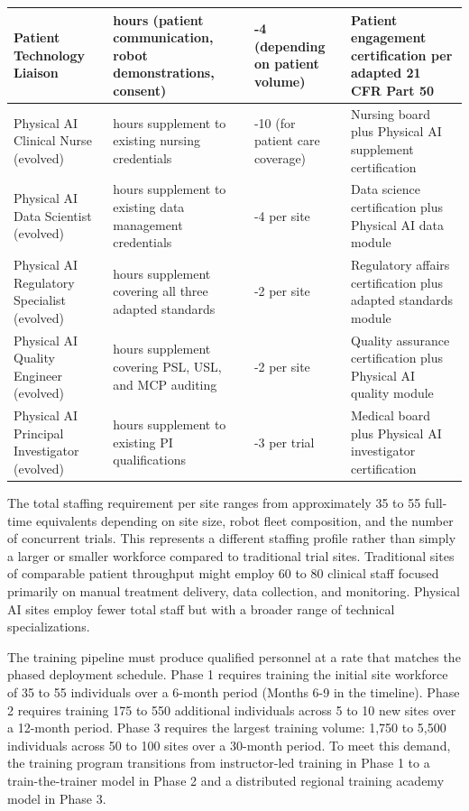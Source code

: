 \begin{longtable}{>{\raggedright\arraybackslash}p{3cm} >{\raggedright\arraybackslash}p{4cm} >{\raggedright\arraybackslash}p{4cm} >{\raggedright\arraybackslash}p{4cm}}
\midrule
Patient Technology Liaison & 80 hours (patient communication, robot demonstrations, consent) & 2-4 (depending on patient volume) & Patient engagement certification per adapted 21 CFR Part 50 \cite{cfr50-adapt} \\
\midrule
Physical AI Clinical Nurse (evolved) & 80 hours supplement to existing nursing credentials & 6-10 (for patient care coverage) & Nursing board plus Physical AI supplement certification \\
\midrule
Physical AI Data Scientist (evolved) & 160 hours supplement to existing data management credentials & 2-4 per site & Data science certification plus Physical AI data module \\
\midrule
Physical AI Regulatory Specialist (evolved) & 100 hours supplement covering all three adapted standards & 1-2 per site & Regulatory affairs certification plus adapted standards module \\
\midrule
Physical AI Quality Engineer (evolved) & 120 hours supplement covering PSL, USL, and MCP auditing & 1-2 per site & Quality assurance certification plus Physical AI quality module \\
\midrule
Physical AI Principal Investigator (evolved) & 80 hours supplement to existing PI qualifications & 1-3 per trial & Medical board plus Physical AI investigator certification \\
\end{longtable}

The total staffing requirement per site ranges from approximately 35 to 55
full-time equivalents depending on site size, robot fleet composition, and
the number of concurrent trials. This represents a different staffing
profile rather than simply a larger or smaller workforce compared to
traditional trial sites. Traditional sites of comparable patient throughput
might employ 60 to 80 clinical staff focused primarily on manual treatment
delivery, data collection, and monitoring. Physical AI sites employ fewer
total staff but with a broader range of technical specializations.

The training pipeline must produce qualified personnel at a rate that matches
the phased deployment schedule. Phase 1 requires training the initial site
workforce of 35 to 55 individuals over a 6-month period (Months 6-9 in the
timeline). Phase 2 requires training 175 to 550 additional individuals across
5 to 10 new sites over a 12-month period. Phase 3 requires the largest
training volume: 1,750 to 5,500 individuals across 50 to 100 sites over a
30-month period. To meet this demand, the training program transitions from
instructor-led training in Phase 1 to a train-the-trainer model in Phase 2
and a distributed regional training academy model in Phase 3.

